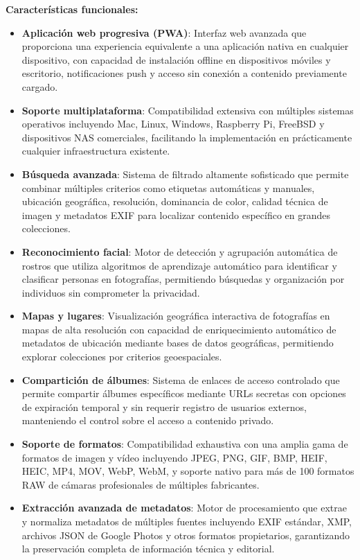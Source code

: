 \textbf{Características funcionales:}
\begin{itemize}
    \item \textbf{Aplicación web progresiva (PWA)}: Interfaz web avanzada que proporciona una experiencia equivalente a una aplicación nativa en cualquier dispositivo, con capacidad de instalación offline en dispositivos móviles y escritorio, notificaciones push y acceso sin conexión a contenido previamente cargado.
    \item \textbf{Soporte multiplataforma}: Compatibilidad extensiva con múltiples sistemas operativos incluyendo Mac, Linux, Windows, Raspberry Pi, FreeBSD y dispositivos NAS comerciales, facilitando la implementación en prácticamente cualquier infraestructura existente.
    \item \textbf{Búsqueda avanzada}: Sistema de filtrado altamente sofisticado que permite combinar múltiples criterios como etiquetas automáticas y manuales, ubicación geográfica, resolución, dominancia de color, calidad técnica de imagen y metadatos EXIF para localizar contenido específico en grandes colecciones.
    \item \textbf{Reconocimiento facial}: Motor de detección y agrupación automática de rostros que utiliza algoritmos de aprendizaje automático para identificar y clasificar personas en fotografías, permitiendo búsquedas y organización por individuos sin comprometer la privacidad.
    \item \textbf{Mapas y lugares}: Visualización geográfica interactiva de fotografías en mapas de alta resolución con capacidad de enriquecimiento automático de metadatos de ubicación mediante bases de datos geográficas, permitiendo explorar colecciones por criterios geoespaciales.
    \item \textbf{Compartición de álbumes}: Sistema de enlaces de acceso controlado que permite compartir álbumes específicos mediante URLs secretas con opciones de expiración temporal y sin requerir registro de usuarios externos, manteniendo el control sobre el acceso a contenido privado.
    \item \textbf{Soporte de formatos}: Compatibilidad exhaustiva con una amplia gama de formatos de imagen y vídeo incluyendo JPEG, PNG, GIF, BMP, HEIF, HEIC, MP4, MOV, WebP, WebM, y soporte nativo para más de 100 formatos RAW de cámaras profesionales de múltiples fabricantes.
    \item \textbf{Extracción avanzada de metadatos}: Motor de procesamiento que extrae y normaliza metadatos de múltiples fuentes incluyendo EXIF estándar, XMP, archivos JSON de Google Photos y otros formatos propietarios, garantizando la preservación completa de información técnica y editorial.

\end{itemize}
